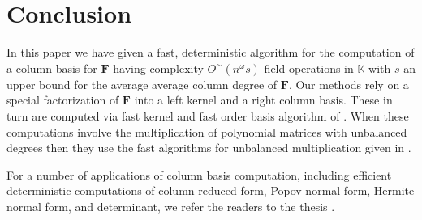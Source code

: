 
\section{Conclusion}

In this paper we have given a fast, deterministic algorithm for the
computation of a column basis for $\mathbf{F}$ having complexity
$O^{\sim}\left(n^{\omega}s\right)$ field operations in $\mathbb{K}$
with $s$ an upper bound for the average average column degree of
$\mathbf{F}$. Our methods rely on a special factorization of $\mathbf{F}$
into a left kernel and a right column basis. These in turn are computed
via fast kernel and fast order basis algorithm of \cite{za2012,ZL2012}.
When these computations involve the multiplication of polynomial matrices
with unbalanced degrees then they use the fast algorithms for unbalanced
multiplication given in \cite{za2012}.

For a number of applications of column basis computation, including
efficient deterministic computations of column reduced form, Popov
normal form, Hermite normal form, and determinant, we refer the readers
to the thesis \cite{zhou:phd2012}.


